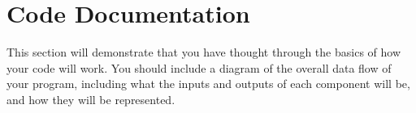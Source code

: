 \documentclass[10pt,twocolumn]{article}
\begin{document}
\begin{comment}

     FIXME
     moderate or standardize the descriptions used as input to the SVM. 
     
     Consider this:
     Descriptions may be written by different authors even if they come from the same API, and this potentially introduces variability. I plan to address this in my paper as an extension for future work and consider some potential ways to handle it (perhaps collecting descriptions for one game from various APIs as an improvement). 

    Future work can involve training the model beyond word embeddings so that it can capture similar qualitative aspects of the game. (this improves recall)
    
    So, future work can include using NLP approaches like sentiment analysis, dependency parsing, etc. in order to further pinpoint game relatedness

    Dependency parsing - An Intelligent Data Analysis for Recommendation Systems Using Machine Learning

    improve conventional collaborative filtering approach by using sentiment analysis on hotel reviews for feature extraction (polarity identification using syntax and semantic analysis), evaluated w/ precision, recall, and F-1

    https://www.hindawi.com/journals/sp/2019/5941096/ - cited

    Sentiment analysis - https://www.sciencedirect.com/science/article/abs/pii/S0920548912001237 - cited

    Sentiment analysis algorithm that examines syntax-level relationships between words (via dependency parsing) in order to provide context for restaurant reviews


    Future work if more time was involved could include scraping review content from average players (from forums, Google reviews, etc.)

    Conclusion:

    
    
\end{comment}

\section{Code Documentation}

This section will demonstrate that you have thought through the basics of how your code will work. You should include a diagram of the overall data flow of your program, including what the inputs and outputs of each component will be, and how they will be represented.
\end{document}
